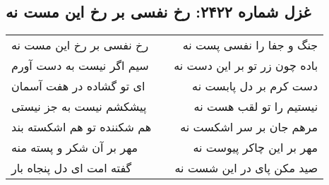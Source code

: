 \begin{center}
\section*{غزل شماره ۲۴۲۲: رخ نفسی بر رخ این مست نه}
\label{sec:2422}
\begin{longtable}{l p{0.5cm} r}
رخ نفسی بر رخ این مست نه
&&
جنگ و جفا را نفسی پست نه
\\
سیم اگر نیست به دست آورم
&&
باده چون زر تو بر این دست نه
\\
ای تو گشاده در هفت آسمان
&&
دست کرم بر دل پابست نه
\\
پیشکشم نیست به جز نیستی
&&
نیستیم را تو لقب هست نه
\\
هم شکننده تو هم اشکسته بند
&&
مرهم جان بر سر اشکست نه
\\
مهر بر آن شکر و پسته منه
&&
مهر بر این چاکر پیوست نه
\\
گفته امت ای دل پنجاه بار
&&
صید مکن پای در این شست نه
\\
\end{longtable}
\end{center}
